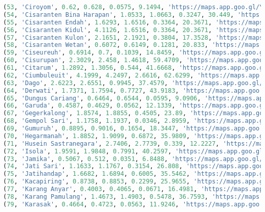 \begin{lstlisting}[language=SQL]
(53, 'Ciroyom', 0.62, 0.628, 0.0575, 9.1494, 'https://maps.app.goo.gl/Yapymy8HTmee3Rag7'),
(54, 'Cisaranten Bina Harapan', 1.0533, 1.0663, 0.3247, 30.449, 'https://maps.app.goo.gl/2wujMrsTP46pbtAe9'),
(55, 'Cisaranten Endah', 1.6293, 1.6516, 0.3364, 20.3671, 'https://maps.app.goo.gl/CceA8DYi8daJKN9E9'),
(56, 'Cisaranten Kidul', 4.1126, 1.6516, 0.3364, 20.3671, 'https://maps.app.goo.gl/TV2CgKNtLEtAePxZ9'),
(57, 'Cisaranten Kulon', 2.1651, 2.1921, 0.3804, 17.3528, 'https://maps.app.goo.gl/jpxH3fopF5XEVQtT6'),
(58, 'Cisaranten Wetan', 0.6072, 0.6149, 0.1281, 20.833, 'https://maps.app.goo.gl/niXmKh7KyEq7gvFj7'),
(59, 'Ciseureuh', 0.6914, 0.7, 0.1039, 14.8459, 'https://maps.app.goo.gl/crTqPWn87TyRAATR7'),
(60, 'Cisurupan', 2.3029, 2.458, 1.4618, 59.4709, 'https://maps.app.goo.gl/mR6cvYk4nhKR4iiCA'),
(61, 'Citarum', 1.2892, 1.3056, 0.544, 41.6668, 'https://maps.app.goo.gl/tR4WBJshXRxidHQDA'),
(62, 'Ciumbuleuit', 4.1999, 4.2497, 2.6616, 62.6299, 'https://maps.app.goo.gl/QLsWVXCYKHx7xyvH9'),
(63, 'Dago', 2.6223, 2.6551, 0.9945, 37.4579, 'https://maps.app.goo.gl/UDV7L22S1AeWB75b9'),
(64, 'Derwati', 1.7371, 1.7594, 0.7727, 43.9183, 'https://maps.app.goo.gl/rASGKNLYx4SW5i1k9'),
(65, 'Dungus Cariang', 0.6464, 0.6544, 0.0595, 9.0906, 'https://maps.app.goo.gl/oMCyHaBi3ygoekAw5'),
(66, 'Garuda', 0.4587, 0.4629, 0.0562, 12.1339, 'https://maps.app.goo.gl/MZ7FDSt35XYAD6Sw9'),
(67, 'Gegerkalong', 1.8574, 1.8855, 0.4505, 23.89, 'https://maps.app.goo.gl/rASGKNLYx4SW5i1k9'),
(68, 'Gempol Sari', 1.1758, 1.1937, 0.0346, 2.8959, 'https://maps.app.goo.gl/TBAPtKcpgKUnvfJH7'),
(69, 'Gumuruh', 0.8895, 0.9016, 0.1654, 18.3447, 'https://maps.app.goo.gl/3GErJhH8sZj3BoaK8'),
(70, 'Hegarmanah', 1.8852, 1.9099, 0.6872, 35.9809, 'https://maps.app.goo.gl/FcP8hWvWiso3QmLA7'),
(71, 'Husein Sastranegara', 2.7406, 2.7739, 0.339, 12.2227, 'https://maps.app.goo.gl/tgQLPZg3RVpMKHHC9'),
(72, 'Isola', 1.9591, 1.9848, 0.7991, 40.2597, 'https://maps.app.goo.gl/G92AgCthPJ5oUkFQ8'),
(73, 'Jamika', 0.5067, 0.512, 0.0351, 6.8488, 'https://maps.app.goo.gl/PLgd2M3Y3MQD35TF7'),
(74, 'Jati Sari', 1.1633, 1.1767, 0.3154, 26.808, 'https://maps.app.goo.gl/XgsHuNcx2jMTaQwX7'),
(75, 'Jatihandap', 1.6682, 1.6894, 0.6005, 35.5462, 'https://maps.app.goo.gl/TrLhtCTnnXcMu8qp9'),
(76, 'Kacapiring', 0.8738, 0.8853, 0.2299, 25.9655, 'https://maps.app.goo.gl/uNCLYYfd5zbfMJ318'),
(77, 'Karang Anyar', 0.4003, 0.4065, 0.0671, 16.4981, 'https://maps.app.goo.gl/9kHYEhe1pp1ehmDH8'),
(78, 'Karang Pamulang', 1.4673, 1.4903, 0.5478, 36.7593, 'https://maps.app.goo.gl/oSckgZeeoo6n9Rfy7'),
(79, 'Karasak', 0.4664, 0.4723, 0.0563, 11.9246, 'https://maps.app.goo.gl/5Ygiinyqa5CZEmvM6'),

\end{lstlisting}
